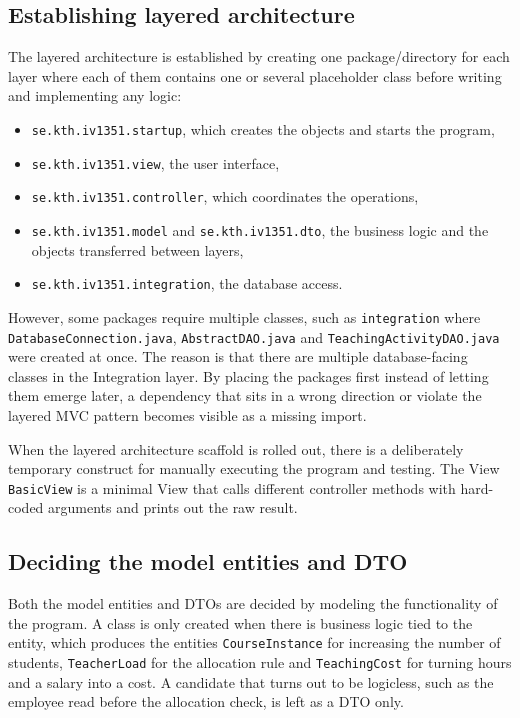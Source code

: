 \documentclass[a4paper]{scrartcl}
\renewcommand{\_}{\textunderscore\allowbreak}
\begin{document}
\subsection{Establishing layered architecture}

The layered architecture is established by creating one package/directory for each layer where each of them contains one or several placeholder class before writing and implementing any logic:

\begin{itemize}
  \item \texttt{se.kth.iv1351.startup}, which creates the objects and starts the program,
  \item \texttt{se.kth.iv1351.view}, the user interface,
  \item \texttt{se.kth.iv1351.controller}, which coordinates the operations,
  \item \texttt{se.kth.iv1351.model} and \texttt{se.kth.iv1351.dto}, the business logic and the objects transferred between layers,
  \item \texttt{se.kth.iv1351.integration}, the database access.
\end{itemize}

However, some packages require multiple classes, such as \texttt{integration} where \texttt{DatabaseConnection.java}, \texttt{AbstractDAO.java} and \texttt{TeachingActivityDAO.java} were created at once. The reason is that there are multiple database-facing classes in the Integration layer. By placing the packages first instead of letting them emerge later, a dependency that sits in a wrong direction or violate the layered MVC pattern becomes visible as a missing import. 

When the layered architecture scaffold is rolled out, there is a deliberately temporary construct for manually executing the program and testing. The View \texttt{BasicView} is a minimal View that calls different controller methods with hard-coded arguments and prints out the raw result.

\subsection{Deciding the model entities and DTO}

Both the model entities and DTOs are decided by modeling the functionality of the program. A class is only created when there is business logic tied to the entity, which produces the entities \texttt{CourseInstance} for increasing the number of students, \texttt{TeacherLoad} for the allocation rule and \texttt{TeachingCost} for turning hours and a salary into a cost. A candidate that turns out to be logicless, such as the employee read before the allocation check, is left as a DTO only.
\end{document}

